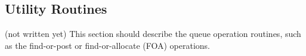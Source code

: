 \documentclass{article}
\begin{document}






\subsection{Utility Routines}
\label{sec:utility-routines}
(not written yet)
This section should describe the queue operation routines, such as the
find-or-post or find-or-allocate (FOA) operations.
\end{document}
